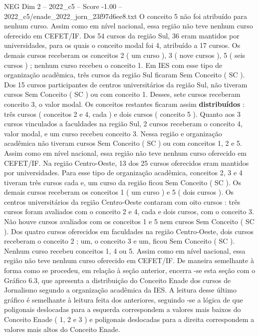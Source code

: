 \begin{textsample}{NEG Dim 2 – 2022\_c5 – Score -1.00 – 2022\_c5/enade\_2022\_jorn\_23f97d6ee8.txt}
O conceito 5 não foi atribuído para nenhum curso.
Assim como em nível nacional, essa região não teve nenhum curso oferecido em CEFET/IF.
Dos 54 cursos da região Sul, 36 eram mantidos por universidades, para os quais o conceito modal foi 4, atribuído a 17 cursos.
Os demais cursos receberam os conceitos 2 ( um curso ), 3 ( nove cursos ), 5 ( seis cursos ) ; nenhum curso recebeu o conceito 1.
Em IES com esse tipo de organização acadêmica, três cursos da região Sul ficaram Sem Conceito ( SC ).
Dos 15 cursos participantes de centros universitários da região Sul, não tiveram cursos Sem Conceito ( SC ) ou com conceito 1.
Desses, sete cursos receberam conceito 3, o valor modal.
Os conceitos restantes ficaram assim \textbf{distribuídos} : três cursos ( conceitos 2 e 4, cada ) e dois cursos ( conceito 5 ).
Quanto aos 3 cursos vinculados a faculdades na região Sul, 2 cursos receberam o conceito 4, valor modal, e um curso recebeu conceito 3.
Nessa região e organização acadêmica não tiveram cursos Sem Conceito ( SC ) ou com conceitos 1, 2 e 5.
Assim como em nível nacional, essa região não teve nenhum curso oferecido em CEFET/IF.
Na região Centro-Oeste, 13 dos 25 cursos oferecidos eram mantidos por universidades.
Para esse tipo de organização acadêmica, conceitos 2, 3 e 4 tiveram três cursos cada e, um curso da região ficou Sem Conceito ( SC ).
Os demais cursos receberam os conceitos 1 ( um curso ) e 5 ( dois cursos ).
Os centros universitários da região Centro-Oeste contaram com oito cursos : três cursos foram avaliados com o conceito 2 e 4, cada e dois cursos, com o conceito 3.
Não houve cursos avaliados com os conceitos 1 e 5 nem cursos Sem Conceito ( SC ).
Dos quatro cursos oferecidos em faculdades na região Centro-Oeste, dois cursos receberam o conceito 2 ; um, o conceito 3 e um, ficou Sem Conceito ( SC ).
Nenhum curso recebeu conceitos 1, 4 ou 5.
Assim como em nível nacional, essa região não teve nenhum curso oferecido em CEFET/IF.
De maneira semelhante à forma como se procedeu, em relação à seção anterior, encerra -se esta seção com o Gráfico 6.3, que apresenta a distribuição do Conceito Enade dos cursos de Jornalismo segundo a organização acadêmica da IES.
A leitura desse último gráfico é semelhante à leitura feita dos anteriores, seguindo -se a lógica de que poligonais deslocadas para a esquerda correspondem a valores mais baixos do Conceito Enade ( 1, 2 e 3 ) e poligonais deslocadas para a direita correspondem a valores mais altos do Conceito Enade.

\end{textsample}
